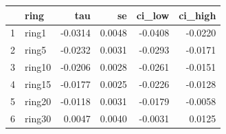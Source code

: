 \begin{table}[ht]
\centering
\begin{tabular}{rlrrrr}
  \hline
 & ring & tau & se & ci_low & ci_high \\ 
  \hline
1 & ring1 & -0.0314 & 0.0048 & -0.0408 & -0.0220 \\ 
  2 & ring5 & -0.0232 & 0.0031 & -0.0293 & -0.0171 \\ 
  3 & ring10 & -0.0206 & 0.0028 & -0.0261 & -0.0151 \\ 
  4 & ring15 & -0.0177 & 0.0025 & -0.0226 & -0.0128 \\ 
  5 & ring20 & -0.0118 & 0.0031 & -0.0179 & -0.0058 \\ 
  6 & ring30 & 0.0047 & 0.0040 & -0.0031 & 0.0125 \\ 
   \hline
\end{tabular}
\end{table}
